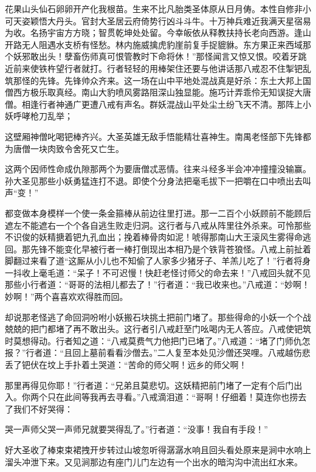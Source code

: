 \documentclass[12pt,UTF8]{ctexbook}
\begin{document}
{	花果山头仙石卵卵开产化我根苗。生来不比凡胎类圣体原从日月俦。本性自修非小可天姿颖悟大丹头。官封大圣居云府倚势行凶斗斗牛。十万神兵难近我满天星宿易为收。名扬宇宙方方晓；智贯乾坤处处留。今幸皈依从释教扶持长老向西游。逢山开路无人阻遇水支桥有怪愁。林内施威擒虎豹崖前复手捉貔貅。东方果正来西域那个妖邪敢出头！孽畜伤师真可恨管教时下命将休！”那怪闻言又惊又恨。咬着牙跳近前来使铁杵望行者就打。行者轻轻的用棒架住还要与他讲话那八戒忍不住掣钯乱筑那怪的先锋。先锋帅众齐来。这一场在山中平地处混战真是好杀：东土大邦上国僧西方极乐取真经。南山大豹喷风雾路阻深山独显能。施巧计弄乖伶无知误捉大唐僧。相逢行者神通广更遭八戒有声名。群妖混战山平处尘土纷飞天不清。那阵上小妖呼哮枪刀乱举；
	
	这壁厢神僧叱喝钯棒齐兴。大圣英雄无敌手悟能精壮喜神生。南禺老怪部下先锋都为唐僧一块肉致令舍死又亡生。
	
	这两个因师性命成仇隙那两个为要唐僧忒恶情。往来斗经多半会冲冲撞撞没输赢。孙大圣见那些小妖勇猛连打不退。即使个分身法把毫毛拔下一把嚼在口中喷出去叫声“变！”
	
	都变做本身模样一个使一条金箍棒从前边往里打进。那一二百个小妖顾前不能顾后遮左不能遮右一个个各自逃生败走归洞。这行者与八戒从阵里往外杀来。可怜那些不识俊的妖精搪着钯九孔血出；挽着棒骨肉如泥！唬得那南山大王滚风生雾得命逃回。那先锋不能变化早被行者一棒打倒现出本相乃是个铁背苍狼怪。八戒上前扯着脚翻过来看了道“这厮从小儿也不知偷了人家多少猪牙子、羊羔儿吃了！”行者将身一抖收上毫毛道：“呆子！不可迟慢！快赶老怪讨师父的命去来！”八戒回头就不见那些小行者道：“哥哥的法相儿都去了！”行者道：“我已收来也。”八戒道：“妙啊！妙啊！”两个喜喜欢欢得胜而回。
	
	却说那老怪逃了命回洞吩咐小妖搬石块挑土把前门堵了。那些得命的小妖一个个战兢兢的把门都堵了再不敢出头。这行者引八戒赶至门吆喝内无人答应。八戒使钯筑时莫想得动。行者知之道：“八戒莫费气力他把门已堵了。”八戒道：“堵了门师仇怎报？”行者道：“且回上墓前看看沙僧去。”二人复至本处见沙僧还哭哩。八戒越伤悲丢了钯伏在坟上手扑着土哭道：“苦命的师父啊！远乡的师父啊！
	
	那里再得见你耶！”行者道：“兄弟且莫悲切。这妖精把前门堵了一定有个后门出入。你两个只在此间等我再去寻看。”八戒滴泪道：“哥啊！仔细着！莫连你也捞去了我们不好哭得：
	
	哭一声师父哭一声师兄就要哭得乱了。”行者道：“没事！我自有手段！”
	
	好大圣收了棒束束裙拽开步转过山坡忽听得潺潺水响且回头看处原来是涧中水响上溜头冲泄下来。又见涧那边有座门儿门左边有一个出水的暗沟沟中流出红水来。
	
}
\end{document}
